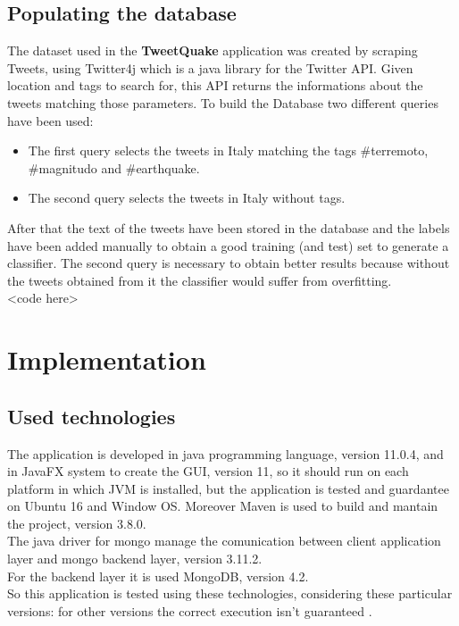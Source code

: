 \documentclass[a4paper, oneside]{article}
\begin{document}
\subsection{Populating the database}
The dataset used in the \textbf{TweetQuake} application was created by scraping Tweets, using Twitter4j which is a java library for the Twitter API. Given location and tags to search for, this API returns the informations about the tweets matching those parameters. To build the Database two different queries have been used: 
\begin{itemize}
\item The first query selects the tweets in Italy matching the tags {\#}terremoto, {\#}magnitudo and {\#}earthquake.
\item The second query selects the tweets in Italy without tags.
\end{itemize} 
After that the text of the tweets have been stored in the database and the labels have been added manually to obtain a good training (and test) set to generate a classifier.
The second query is necessary to obtain better results because without the tweets obtained from it the classifier would suffer from overfitting.\\

<code here>

\clearpage

\section{Implementation}
\subsection{Used technologies}
The application is developed in java programming language, version 11.0.4, and in JavaFX system to create the GUI, version 11, so it should run on each platform in which JVM is installed, but the application is tested and guardantee on Ubuntu 16 and Window OS. Moreover Maven is used  to build and mantain the project, version 3.8.0. \\
The java driver for mongo manage the comunication between client application layer and mongo backend layer, version 3.11.2.\\ 
For the backend layer it is used MongoDB, version 4.2.\\
So this application is tested using these technologies, considering these particular versions: for other versions the correct execution isn't guaranteed .\\
\end{document}
